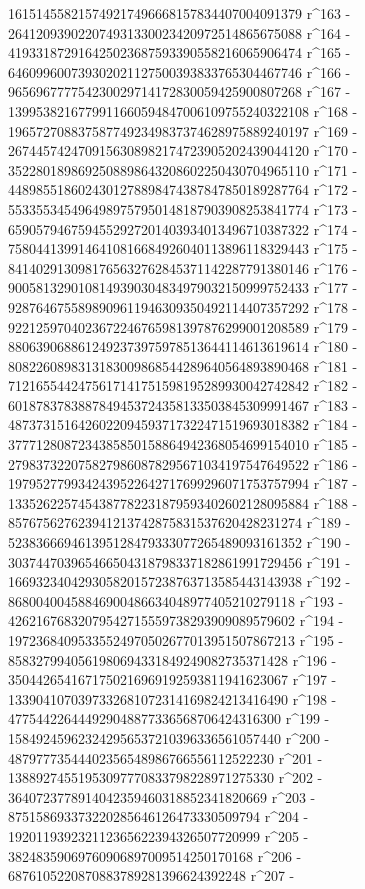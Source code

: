        161514558215749217496668157834407004091379 r^163 - 
       264120939022074931330023420972514865675088 r^164 - 
       419331872916425023687593390558216065906474 r^165 - 
       646099600739302021127500393833765304467746 r^166 - 
       965696777754230029714172830059425900807268 r^167 - 
       1399538216779911660594847006109755240322108 r^168 - 
       1965727088375877492349837374628975889240197 r^169 - 
       2674457424709156308982174723905202439044120 r^170 - 
       3522801898692508898643208602250430704965110 r^171 - 
       4489855186024301278898474387847850189287764 r^172 - 
       5533553454964989757950148187903908253841774 r^173 - 
       6590579467594552927201403934013496710387322 r^174 - 
       7580441399146410816684926040113896118329443 r^175 - 
       8414029130981765632762845371142287791380146 r^176 - 
       9005813290108149390304834979032150999752433 r^177 - 
       9287646755898909611946309350492114407357292 r^178 - 
       9221259704023672246765981397876299001208589 r^179 - 
       8806390688612492373975978513644114613619614 r^180 - 
       8082260898313183009868544289640564893890468 r^181 - 
       7121655442475617141751598195289930042742842 r^182 - 
       6018783783887849453724358133503845309991467 r^183 - 
       4873731516426022094593717322471519693018382 r^184 - 
       3777128087234385850158864942368054699154010 r^185 - 
       2798373220758279860878295671034197547649522 r^186 - 
       1979527799342439522642717699296071753757994 r^187 - 
       1335262257454387782231879593402602128095884 r^188 - 
       857675627623941213742875831537620428231274 r^189 - 
       523836669461395128479333077265489093161352 r^190 - 
       303744703965466504318798337182861991729456 r^191 - 
       166932340429305820157238763713585443143938 r^192 - 
       86800400458846900486634048977405210279118 r^193 - 
       42621676832079542715559738293909089579602 r^194 - 
       19723684095335524970502677013951507867213 r^195 - 
       8583279940561980694331849249082735371428 r^196 - 
       3504426541671750216969192593811941623067 r^197 - 
       1339041070397332681072314169824213416490 r^198 - 
       477544226444929048877336568706424316300 r^199 - 
       158492459623242956537210396336561057440 r^200 - 
       48797773544402356548986766556112522230 r^201 - 
       13889274551953097770833798228971275330 r^202 - 
       3640723778914042359460318852341820669 r^203 - 
       875158693373220285646126473330509794 r^204 - 
       192011939232112365622394326507720999 r^205 - 
       38248359069760906897009514250170168 r^206 - 
       6876105220870883789281396624392248 r^207 - 
